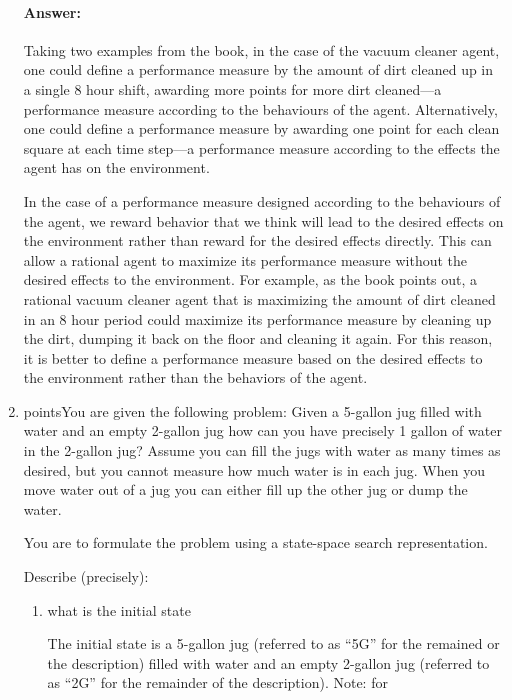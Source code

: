 \documentclass[11pt]{article}  %
\begin{document}
\begin{enumerate}
    \paragraph{Answer:}
    Taking two examples from the book, in the case of the vacuum cleaner agent,
    one could define a performance measure by the amount of dirt cleaned up in a
    single 8 hour shift, awarding more points for more dirt cleaned---a
    performance measure according to the behaviours of the agent.
    Alternatively, one could define a performance measure by awarding one point
    for each clean square at each time step---a performance measure according
    to the effects the agent has on the environment.
    \par
    In the case of a performance measure designed according to the behaviours of
    the agent, we reward behavior that we think will lead to the desired effects
    on the environment rather than reward for the desired effects directly.
    This can allow a rational agent to maximize its performance measure without
    the desired effects to the environment. For example, as the book points out,
    a rational vacuum cleaner agent that is maximizing the amount of dirt
    cleaned in an 8 hour period could maximize its performance measure by
    cleaning up the dirt, dumping it back on the floor and cleaning it again. 
    For this reason, it is better to define a performance
    measure based on the desired effects to the environment rather than the
    behaviors of the agent.
    \item {} points\rbrack You are given the following problem: Given a
    5-gallon jug filled with water and an empty 2-gallon jug how can you have
    precisely 1 gallon of water in the 2-gallon jug? Assume you can fill the
    jugs with water as many times as desired, but you cannot measure how much
    water is in each jug. When you move water out of a jug you can either fill
    up the other jug or dump the water.
    \par 
    You are to formulate the problem using a state-space search
    representation.
    \par 
    Describe (precisely):
    \begin{enumerate}
      \item what is the initial state
      \par
      The initial state is a 5-gallon jug (referred to as ``5G'' for the
      remained or the description) filled with water and an empty 2-gallon jug
      (referred to as ``2G'' for the remainder of the description).  Note: for

\end{enumerate}
\end{enumerate}
\end{document}
